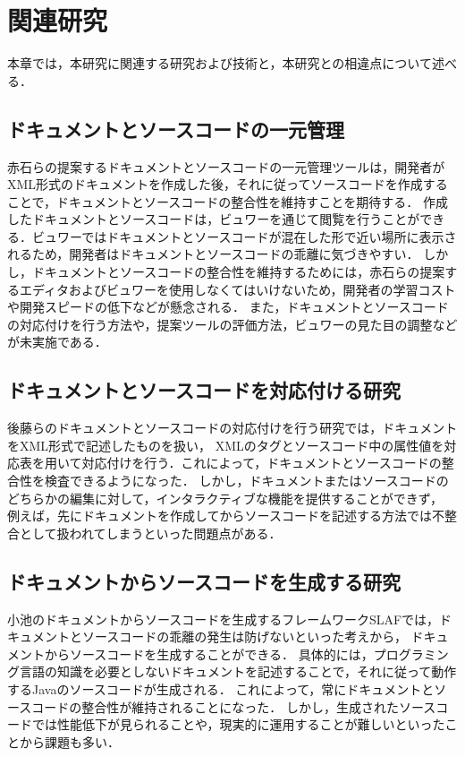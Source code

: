 \chapter{関連研究}
本章では，本研究に関連する研究および技術と，本研究との相違点について述べる．

\section{ドキュメントとソースコードの一元管理}
赤石らの提案するドキュメントとソースコードの一元管理ツール\cite{seigousei}は，開発者がXML形式のドキュメントを作成した後，それに従ってソースコードを作成することで，ドキュメントとソースコードの整合性を維持すことを期待する．
作成したドキュメントとソースコードは，ビュワーを通じて閲覧を行うことができる．ビュワーではドキュメントとソースコードが混在した形で近い場所に表示されるため，開発者はドキュメントとソースコードの乖離に気づきやすい．
しかし，ドキュメントとソースコードの整合性を維持するためには，赤石らの提案するエディタおよびビュワーを使用しなくてはいけないため，開発者の学習コストや開発スピードの低下などが懸念される．
また，ドキュメントとソースコードの対応付けを行う方法や，提案ツールの評価方法，ビュワーの見た目の調整などが未実施である．

\section{ドキュメントとソースコードを対応付ける研究}
後藤らのドキュメントとソースコードの対応付けを行う研究\cite{taiouduke}では，ドキュメントをXML形式で記述したものを扱い，
XMLのタグとソースコード中の属性値を対応表を用いて対応付けを行う．これによって，ドキュメントとソースコードの整合性を検査できるようになった．
しかし，ドキュメントまたはソースコードのどちらかの編集に対して，インタラクティブな機能を提供することができず，
例えば，先にドキュメントを作成してからソースコードを記述する方法では不整合として扱われてしまうといった問題点がある．

\section{ドキュメントからソースコードを生成する研究}
小池のドキュメントからソースコードを生成するフレームワークSLAF\cite{framework}では，ドキュメントとソースコードの乖離の発生は防げないといった考えから，
ドキュメントからソースコードを生成することができる．
具体的には，プログラミング言語の知識を必要としないドキュメントを記述することで，それに従って動作するJavaのソースコードが生成される．
これによって，常にドキュメントとソースコードの整合性が維持されることになった．
しかし，生成されたソースコードでは性能低下が見られることや，現実的に運用することが難しいといったことから課題も多い．

